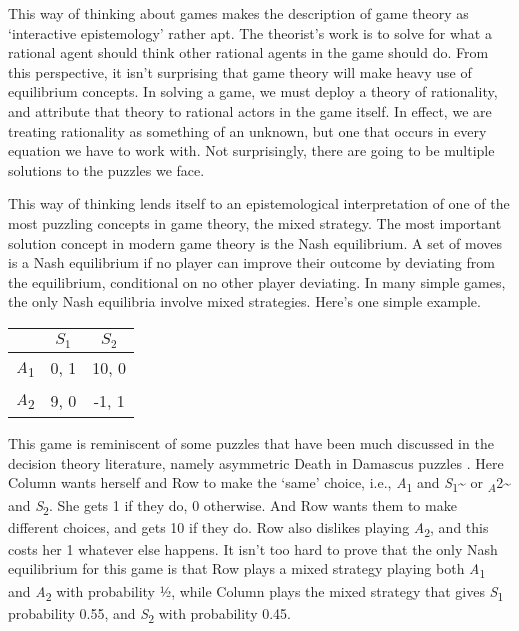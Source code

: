 \documentclass[
  11pt,
]{book}
\begin{document}
This way of thinking about games makes the description of game theory as `interactive epistemology' \citep{Aumann1999} rather apt. The theorist's work is to solve for what a rational agent should think other rational agents in the game should do. From this perspective, it isn't surprising that game theory will make heavy use of equilibrium concepts. In solving a game, we must deploy a theory of rationality, and attribute that theory to rational actors in the game itself. In effect, we are treating rationality as something of an unknown, but one that occurs in every equation we have to work with. Not surprisingly, there are going to be multiple solutions to the puzzles we face.

This way of thinking lends itself to an epistemological interpretation of one of the most puzzling concepts in game theory, the mixed strategy. The most important solution concept in modern game theory is the Nash equilibrium. A set of moves is a Nash equilibrium if no player can improve their outcome by deviating from the equilibrium, conditional on no other player deviating. In many simple games, the only Nash equilibria involve mixed strategies. Here's one simple example.

\begin{longtable}[]{@{}lcc@{}}
\toprule\noalign{}
& \(S_1\) & \(S_2\) \\
\midrule\noalign{}
\endhead
\bottomrule\noalign{}
\endlastfoot
\emph{A}\textsubscript{1} & 0, 1 & 10, 0 \\
\emph{A}\textsubscript{2} & 9, 0 & -1, 1 \\
\end{longtable}

This game is reminiscent of some puzzles that have been much discussed in the decision theory literature, namely asymmetric Death in Damascus puzzles \citep{Richter1984} . Here Column wants herself and Row to make the `same' choice, i.e., \emph{A}\textsubscript{1} and \emph{S}\textsubscript{1}\textasciitilde{} or \textsubscript{\emph{A}}2\textasciitilde{} and \emph{S}\textsubscript{2}. She gets 1 if they do, 0 otherwise. And Row wants them to make different choices, and gets 10 if they do. Row also dislikes playing \emph{A}\textsubscript{2}, and this costs her 1 whatever else happens. It isn't too hard to prove that the only Nash equilibrium for this game is that Row plays a mixed strategy playing both \emph{A}\textsubscript{1} and \emph{A}\textsubscript{2} with probability ½, while Column plays the mixed strategy that gives \emph{S}\textsubscript{1} probability 0.55, and \emph{S}\textsubscript{2} with probability 0.45.
\end{document}
